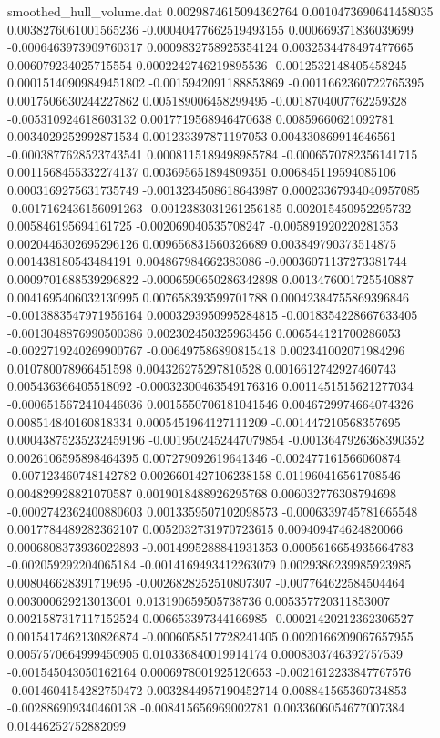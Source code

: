 \begin{filecontents}{smoothed_hull_volume.dat}
0.0029874615094362764	0.0010473690641458035	0.0038276061001565236	-0.00040477662519493155	0.000669371836039699	-0.0006463973909760317	0.0009832758925354124	0.0032534478497477665	0.006079234025715554	0.0002242746219895536	-0.0012532148405458245	0.00015140909849451802	-0.0015942091188853869	-0.0011662360722765395	0.0017506630244227862	0.005189006458299495	-0.0018704007762259328	-0.005310924618603132	0.0017719568946470638	0.00859660621092781
0.0034029252992871534	0.001233397871197053	0.004330869914646561	-0.0003877628523743541	0.0008115189498985784	-0.0006570782356141715	0.0011568455332274137	0.003695651894809351	0.006845119594085106	0.0003169275631735749	-0.0013234508618643987	0.00023367934040957085	-0.0017162436156091263	-0.0012383031261256185	0.002015450952295732	0.005846195694161725	-0.002069040535708247	-0.005891920220281353	0.0020446302695296126	0.009656831560326689
0.003849790373514875	0.001438180543484191	0.004867984662383086	-0.00036071137273381744	0.0009701688539296822	-0.0006590650286342898	0.0013476001725540887	0.0041695406032130995	0.007658393599701788	0.00042384755869396846	-0.0013883547971956164	0.0003293950995284815	-0.0018354228667633405	-0.0013048876990500386	0.002302450325963456	0.006544121700286053	-0.0022719240269900767	-0.006497586890815418	0.002341002071984296	0.010780078966451598
0.004326275297810528	0.0016612742927460743	0.005436366405518092	-0.00032300463549176316	0.0011451515621277034	-0.0006515672410446036	0.0015550706181041546	0.0046729974664074326	0.008514840160818334	0.0005451964127111209	-0.001447210568357695	0.00043875235232459196	-0.0019502452447079854	-0.0013647926368390352	0.0026106595898464395	0.007279092619641346	-0.002477161566060874	-0.007123460748142782	0.0026601427106238158	0.011960416561708546
0.004829928821070587	0.0019018488926295768	0.006032776308794698	-0.0002742362400880603	0.0013359507102098573	-0.0006339745781665548	0.0017784489282362107	0.0052032731970723615	0.009409474624820066	0.0006808373936022893	-0.0014995288841931353	0.0005616654935664783	-0.002059292204065184	-0.0014169493412263079	0.0029386239985923985	0.008046628391719695	-0.0026828252510807307	-0.007764622584504464	0.003000629213013001	0.013190659505738736
0.005357720311853007	0.0021587317117152524	0.006653397344166985	-0.00021420212362306527	0.0015417462130826874	-0.0006058517728241405	0.0020166209067657955	0.0057570664999450905	0.010336840019914174	0.0008303746392757539	-0.001545043050162164	0.0006978001925120653	-0.0021612233847767576	-0.0014604154282750472	0.0032844957190452714	0.008841565360734853	-0.002886909340460138	-0.008415656969002781	0.0033606054677007384	0.01446252752882099

\end{filecontents}
